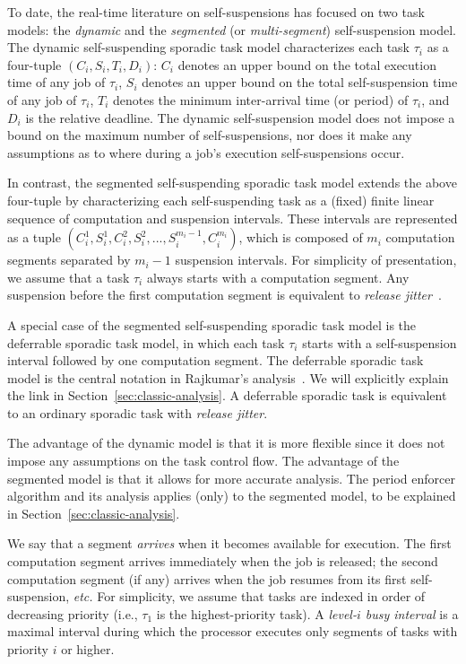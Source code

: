 To date, the real-time literature on self-suspensions has focused on two task models: the \emph{dynamic} and the \emph{segmented} (or \emph{multi-segment}) self-suspension model. 
The dynamic self-suspending sporadic task model characterizes each
task $\tau_i$ as a four-tuple $(C_i,S_i,T_i,D_i)$: 
$C_i$ denotes an upper bound on the total execution time of any job of $\tau_i$,
$S_i$ denotes an upper bound on the total self-suspension time of any job of $\tau_i$,
$T_i$ denotes the minimum inter-arrival time (or period) of $\tau_i$, and $D_i$ is the relative deadline. The dynamic self-suspension model does not impose a bound on the maximum number of self-suspensions, nor does it make any assumptions as to where during a job's execution self-suspensions occur.

In contrast, the segmented self-suspending sporadic task model extends the above four-tuple by characterizing each self-suspending task as a (fixed) finite linear sequence of computation and suspension intervals. These intervals are represented as a tuple
$(C_{i}^1,S_{i}^1,C_{i}^2,S_{i}^2,...,S_{i}^{m_i-1},C_{i}^{m_i})$, which is composed of $m_i$ computation segments separated by $m_i-1$ suspension intervals. For simplicity of presentation, we assume that a task $\tau_i$ always starts with a computation segment. Any suspension before the first computation segment is equivalent to \emph{release jitter}~\cite{ABRTW:93}.

A special case of the segmented self-suspending sporadic task model is the deferrable sporadic task model, in which each task $\tau_i$ starts with a self-suspension interval followed by one computation segment. The deferrable sporadic task model is the central notation in Rajkumar's analysis~\cite{Raj:suspension1991}. We will explicitly explain the link in Section~\ref{sec:classic-analysis}. A deferrable sporadic task is equivalent to 
an ordinary sporadic task with \emph{release jitter}. 

The advantage of the dynamic model is that it is more flexible since it does not impose any assumptions on the task control flow. The advantage of the segmented model is that it allows for more accurate analysis. The period enforcer algorithm and its analysis applies (only) to the segmented model, to be explained in Section~\ref{sec:classic-analysis}.

We say that a segment \emph{arrives} when it becomes available for execution. The first computation segment arrives immediately when the job is released; the second computation segment (if any) arrives when the job resumes from its first self-suspension, \textit{etc.} For simplicity, we assume that tasks are indexed in order of decreasing priority (i.e., $\tau_1$ is the highest-priority task). A \emph{level-$i$ busy interval} is a maximal interval during which  the processor executes only segments of tasks with priority $i$ or higher.


